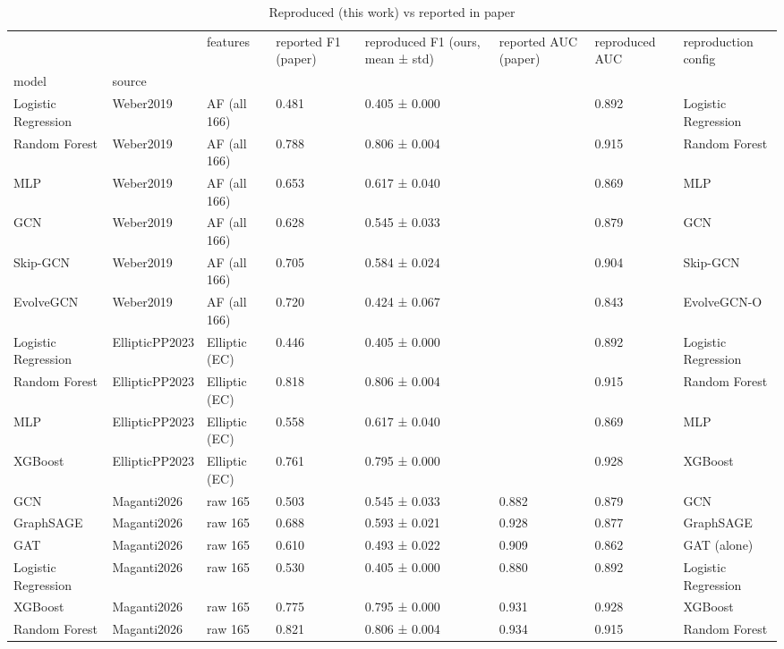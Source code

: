 \begin{table}
\caption{Reproduced (this work) vs reported in paper}
\label{tab:03_reproduced_vs_reported}
\begin{tabular}{llllllll}
\toprule
 &  & features & reported F1 (paper) & reproduced F1 (ours, mean ± std) & reported AUC (paper) & reproduced AUC & reproduction config \\
model & source &  &  &  &  &  &  \\
\midrule
Logistic Regression & Weber2019 & AF (all 166) & 0.481 & 0.405 ± 0.000 &  & 0.892 & Logistic Regression \\
\cline{1-8}
Random Forest & Weber2019 & AF (all 166) & 0.788 & 0.806 ± 0.004 &  & 0.915 & Random Forest \\
\cline{1-8}
MLP & Weber2019 & AF (all 166) & 0.653 & 0.617 ± 0.040 &  & 0.869 & MLP \\
\cline{1-8}
GCN & Weber2019 & AF (all 166) & 0.628 & 0.545 ± 0.033 &  & 0.879 & GCN \\
\cline{1-8}
Skip-GCN & Weber2019 & AF (all 166) & 0.705 & 0.584 ± 0.024 &  & 0.904 & Skip-GCN \\
\cline{1-8}
EvolveGCN & Weber2019 & AF (all 166) & 0.720 & 0.424 ± 0.067 &  & 0.843 & EvolveGCN-O \\
\cline{1-8}
Logistic Regression & EllipticPP2023 & Elliptic (EC) & 0.446 & 0.405 ± 0.000 &  & 0.892 & Logistic Regression \\
\cline{1-8}
Random Forest & EllipticPP2023 & Elliptic (EC) & 0.818 & 0.806 ± 0.004 &  & 0.915 & Random Forest \\
\cline{1-8}
MLP & EllipticPP2023 & Elliptic (EC) & 0.558 & 0.617 ± 0.040 &  & 0.869 & MLP \\
\cline{1-8}
XGBoost & EllipticPP2023 & Elliptic (EC) & 0.761 & 0.795 ± 0.000 &  & 0.928 & XGBoost \\
\cline{1-8}
GCN & Maganti2026 & raw 165 & 0.503 & 0.545 ± 0.033 & 0.882 & 0.879 & GCN \\
\cline{1-8}
GraphSAGE & Maganti2026 & raw 165 & 0.688 & 0.593 ± 0.021 & 0.928 & 0.877 & GraphSAGE \\
\cline{1-8}
GAT & Maganti2026 & raw 165 & 0.610 & 0.493 ± 0.022 & 0.909 & 0.862 & GAT (alone) \\
\cline{1-8}
Logistic Regression & Maganti2026 & raw 165 & 0.530 & 0.405 ± 0.000 & 0.880 & 0.892 & Logistic Regression \\
\cline{1-8}
XGBoost & Maganti2026 & raw 165 & 0.775 & 0.795 ± 0.000 & 0.931 & 0.928 & XGBoost \\
\cline{1-8}
Random Forest & Maganti2026 & raw 165 & 0.821 & 0.806 ± 0.004 & 0.934 & 0.915 & Random Forest \\
\cline{1-8}
\bottomrule
\end{tabular}
\end{table}
